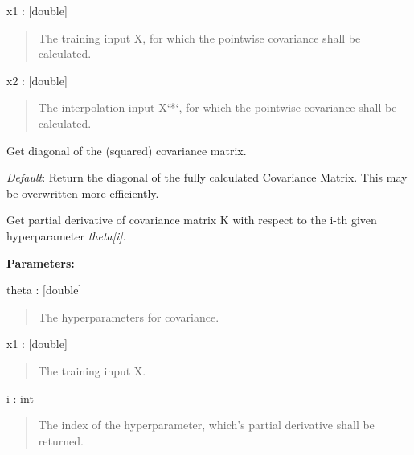 \documentclass[letterpaper,10pt,english]{sphinxmanual}
\begin{document}
\begin{fulllineitems}
\begin{fulllineitems}
x1 : {[}double{]}
\begin{quote}

The training input X, for which the
pointwise covariance shall be calculated.
\end{quote}

x2 : {[}double{]}
\begin{quote}

The interpolation input X{}`*{}`, for which the
pointwise covariance shall be calculated.
\end{quote}

\end{fulllineitems}


\begin{fulllineitems}
\label{covars:pygp.covar.CovarianceFunction.Kdiag}
Get diagonal of the (squared) covariance matrix.

\emph{Default}: Return the diagonal of the fully
calculated Covariance Matrix. This may be overwritten
more efficiently.

\end{fulllineitems}


\begin{fulllineitems}
\label{covars:pygp.covar.CovarianceFunction.Kgrad_theta}
Get partial derivative of covariance matrix K
with respect to the i-th given
hyperparameter \emph{theta{[}i{]}}.

\textbf{Parameters:}

theta : {[}double{]}
\begin{quote}

The hyperparameters for covariance.
\end{quote}

x1 : {[}double{]}
\begin{quote}

The training input X.
\end{quote}

i : int
\begin{quote}

The index of the hyperparameter, which's
partial derivative shall be returned.
\end{quote}


\end{fulllineitems}
\end{fulllineitems}
\end{document}
